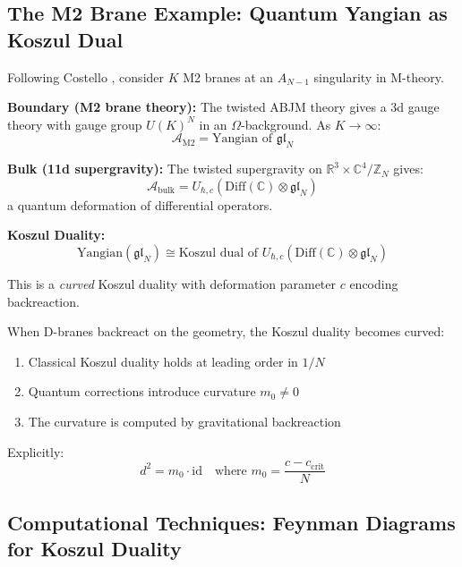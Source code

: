 \subsection{The M2 Brane Example: Quantum Yangian as Koszul Dual}

\begin{example}\label{ex:M2-brane}
Following Costello \cite{Costello2017}, consider $K$ M2 branes at an $A_{N-1}$ singularity in M-theory.

\textbf{Boundary (M2 brane theory):}
The twisted ABJM theory gives a 3d gauge theory with gauge group $U(K)^N$ in an $\Omega$-background. As $K \to \infty$:
$$\mathcal{A}_{\text{M2}} = \text{Yangian of } \mathfrak{gl}_N$$

\textbf{Bulk (11d supergravity):}
The twisted supergravity on $\mathbb{R}^3 \times \mathbb{C}^4/\mathbb{Z}_N$ gives:
$$\mathcal{A}_{\text{bulk}} = U_{\hbar,c}(\text{Diff}(\mathbb{C}) \otimes \mathfrak{gl}_N)$$
a quantum deformation of differential operators.

\textbf{Koszul Duality:}
$$\boxed{\text{Yangian}(\mathfrak{gl}_N) \cong \text{Koszul dual of } U_{\hbar,c}(\text{Diff}(\mathbb{C}) \otimes \mathfrak{gl}_N)}$$

This is a \emph{curved} Koszul duality with deformation parameter $c$ encoding backreaction.
\end{example}

\begin{theorem}\label{thm:curved-koszul}
When D-branes backreact on the geometry, the Koszul duality becomes curved:
\begin{enumerate}
\item Classical Koszul duality holds at leading order in $1/N$
\item Quantum corrections introduce curvature $m_0 \neq 0$
\item The curvature is computed by gravitational backreaction
\end{enumerate}

Explicitly:
$$d^2 = m_0 \cdot \text{id} \quad \text{where } m_0 = \frac{c - c_{\text{crit}}}{N}$$
\end{theorem}

\subsection{Computational Techniques: Feynman Diagrams for Koszul Duality}

